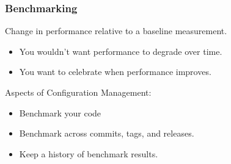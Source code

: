 \begin{frame}

\frametitle{Benchmarking}

\begin{center}

Change in performance relative to a baseline measurement.

\end{center}

\vspace{\fill}

\begin{itemize}

\item You wouldn't want performance to degrade over time.

\item You want to celebrate when performance improves.

\end{itemize}

\vspace{\fill}

\footnotesize

Aspects of Configuration Management:

\begin{itemize}

\item Benchmark your code

\item Benchmark across commits, tags, and releases.

\item Keep a history of benchmark results.

\end{itemize}

\end{frame}
